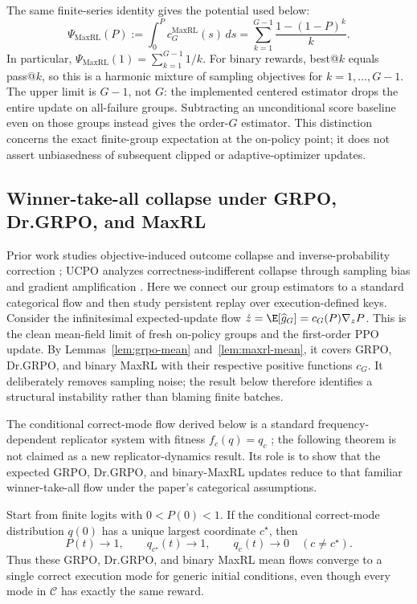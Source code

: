 The same finite-series identity gives the potential used below:
\begin{equation}
 \Psi_{\mathrm{MaxRL}}(P)
 :=\int_0^P c_G^{\mathrm{MaxRL}}(s)\,ds
 =\sum_{k=1}^{G-1}\frac{1-(1-P)^k}{k}.
 \label{eq:maxrl-potential-finite-sum}
\end{equation}
In particular, $\Psi_{\mathrm{MaxRL}}(1)=\sum_{k=1}^{G-1}1/k$.
For binary rewards, best@\(k\) equals pass@\(k\), so this is a harmonic
mixture of sampling objectives for $k=1,\ldots,G-1$. The upper limit is
$G-1$, not $G$: the implemented centered estimator drops the entire update
on all-failure groups. Subtracting an unconditional score baseline even on
those groups instead gives the order-$G$ estimator. This distinction concerns
the exact finite-group expectation at the on-policy point; it does not assert
unbiasedness of subsequent clipped or adaptive-optimizer updates.

\subsection{Winner-take-all collapse under GRPO, Dr.GRPO, and MaxRL}
\label{app:theory-collapse}

Prior work studies objective-induced outcome collapse and inverse-probability
correction \citep{sinha2026expected}; UCPO analyzes correctness-indifferent collapse
through sampling bias and gradient amplification \citep[Section~4]{lochab2026ucpo}.
Here we connect our group estimators to a standard categorical flow and then study
persistent replay over execution-defined keys.
Consider the infinitesimal expected-update flow
$\dot z=\E[\widehat g_G]=c_G(P)\nabla_zP$. This is the clean mean-field limit
of fresh on-policy groups and the first-order PPO update. By Lemmas~\ref{lem:grpo-mean} and~\ref{lem:maxrl-mean}, it covers GRPO, Dr.GRPO, and binary MaxRL with their respective positive functions $c_G$. It deliberately
removes sampling noise; the result below therefore identifies a structural
instability rather than blaming finite batches.

The conditional correct-mode flow derived below is a standard
frequency-dependent replicator system with fitness $f_c(q)=q_c$
\citep{hofbauer1998evolutionary}; the following
theorem is not claimed as a new replicator-dynamics result. Its role is to show
that the expected GRPO, Dr.GRPO, and binary-MaxRL updates reduce to that
familiar winner-take-all flow under the paper's categorical assumptions.

\begin{theorem}
\label{thm:grpo-collapse}
Start from finite logits with $0<P(0)<1$. If the conditional correct-mode
distribution $q(0)$ has a unique largest coordinate $c^\star$, then
\[
  P(t)\longrightarrow1,
  \qquad
  q_{c^\star}(t)\longrightarrow1,
  \qquad
  q_c(t)\longrightarrow0\quad(c\ne c^\star).
\]
Thus these GRPO, Dr.GRPO, and binary MaxRL mean flows converge to a single
correct execution mode for generic initial conditions, even though every mode
in $\mathcal C$ has exactly the same reward.
\end{theorem}

